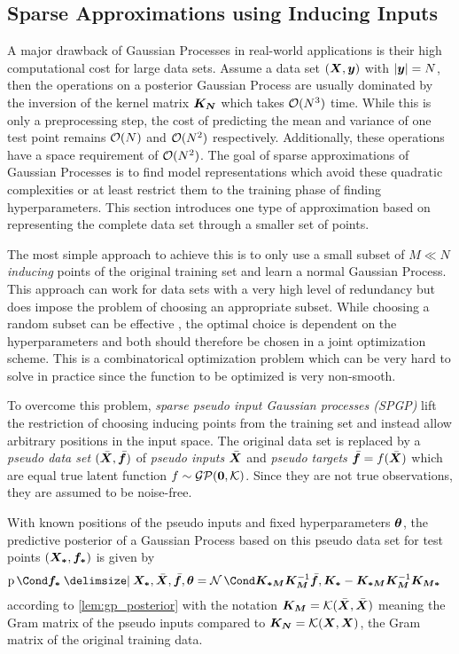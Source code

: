 \subsection{Sparse Approximations using Inducing Inputs}
A major drawback of Gaussian Processes in real-world applications is their high computational cost for large data sets.
Assume a data set $(\bm{X}, \bm{y})$ with $\vert\bm{y}\vert = N$, then the operations on a posterior Gaussian Process are usually dominated by the inversion of the kernel matrix $\bm{K_N}$ which takes $\operatorname{\mathcal{O}}(N^3)$ time.
While this is only a preprocessing step, the cost of predicting the mean and variance of one test point remains $\operatorname{\mathcal{O}}(N)$ and $\operatorname{\mathcal{O}}(N^2)$ respectively.
Additionally, these operations have a space requirement of $\operatorname{\mathcal{O}}(N^2)$.
The goal of sparse approximations of Gaussian Processes is to find model representations which avoid these quadratic complexities or at least restrict them to the training phase of finding hyperparameters.
This section introduces one type of approximation based on representing the complete data set through a smaller set of points.

The most simple approach to achieve this is to only use a small subset of $M \ll N$ \emph{inducing} points of the original training set and learn a normal Gaussian Process.
This approach can work for data sets with a very high level of redundancy but does impose the problem of choosing an appropriate subset.
While choosing a random subset can be effective \cite{snelson_flexible_2007}, the optimal choice is dependent on the hyperparameters and both should therefore be chosen in a joint optimization scheme.
This is a combinatorical optimization problem which can be very hard to solve in practice since the function to be optimized is very non-smooth.

To overcome this problem, \emph{sparse pseudo input Gaussian processes (SPGP)} \cite{snelson_flexible_2007} lift the restriction of choosing inducing points from the training set and instead allow arbitrary positions in the input space.
The original data set is replaced by a \emph{pseudo data set} $(\bar{\bm{X}}, \bar{\bm{f}})$ of \emph{pseudo inputs} $\bar{\bm{X}}$ and \emph{pseudo targets} $\bar{\bm{f}} = f(\bar{\bm{X}})$ which are equal true latent function $f \sim \operatorname{\mathcal{GP}}(\bm{0}, \operatorname{\mathcal{K}})$.
Since they are not true observations, they are assumed to be noise-free.

With known positions of the pseudo inputs and fixed hyperparameters $\bm{\theta}$, the predictive posterior of a Gaussian Process based on this pseudo data set for test points $(\bm{X_\ast}, \bm{f_\ast})$ is given by
\begin{align}
    \Prob{\mat{f_\ast} \given \mat{X_\ast}, \ps{\mat{X}}, \ps{\mat{f}}, \mat{\theta}} &= \Gaussian{\mat{K_{\ast M}}\mat{K_M}^{-1} \ps{\mat{f}}, \mat{K_\ast} - \mat{K_{\ast M}} \mat{K_M}^{-1} \mat{K_{M \ast}}}
\end{align}
according to \cref{lem:gp_posterior} with the notation $\bm{K_M} = \operatorname{\mathcal{K}}(\bar{\bm{X}}, \bar{\bm{X}})$ meaning the Gram matrix of the pseudo inputs compared to $\bm{K_N} = \operatorname{\mathcal{K}}(\bm{X}, \bm{X})$, the Gram matrix of the original training data.

